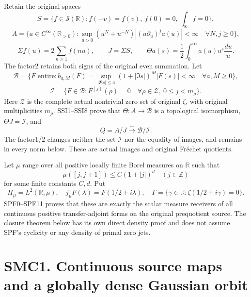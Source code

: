 Retain the original spaces \[
S=\{f\in\mathcal S(\mathbb R):f(-v)=f(v),\ f(0)=0,\ \int_{\mathbb R}f=0\},
\] \[
A=\{a\in C^\infty(\mathbb R_{>0}):
\sup_{u>0}(u^N+u^{-N})|(u\partial_u)^ja(u)|<\infty\quad\forall N,j\ge0\},
\] \[
\Sigma f(u)=2\sum_{n\ge1}f(nu),\qquad J=\Sigma S,\qquad
\Theta a(s)=\frac12\int_0^\infty a(u)u^s\frac{du}{u}.
\tag{SMC0.1}
\] The factor2 retains both signs of the original even summation. Let \[
\mathcal B=\{F\text{ entire}:b_{a,M}(F)=
\sup_{|\Re s|\le a}(1+|\Im s|)^M|F(s)|<\infty\quad\forall a,M\ge0\},
\] \[
\mathcal I=\{F\in\mathcal B:F^{(j)}(\rho)=0\quad
\forall\rho\in\mathscr Z,\ 0\le j<m_\rho\}.
\tag{SMC0.2}
\] Here \(\mathscr Z\) is the complete actual nontrivial zero set of
original \(\zeta\), with original multiplicities \(m_\rho\). SSI1--SSI8
prove that \(\Theta:A\to\mathcal B\) is a topological isomorphism,
\(\Theta J=\mathcal I\), and \[
Q=A/J\xrightarrow{\sim}\mathcal B/\mathcal I.
\tag{SMC0.3}
\] The factor1/2 changes neither the set \(\mathcal I\) nor the equality
of images, and remains in every norm below. These are actual images and
original Fréchet quotients.

Let \(\mu\) range over all positive locally finite Borel measures on
\(\mathbb R\) such that \[
\mu([j,j+1])\le C(1+|j|)^d\quad(j\in\mathbb Z)
\tag{SMC0.4}
\] for some finite constants \(C,d\). Put \[
H_\mu=L^2(\mathbb R,\mu),\quad
j_\mu F(\lambda)=F(1/2+i\lambda),\quad
\Gamma=\{\gamma\in\mathbb R:\zeta(1/2+i\gamma)=0\}.
\tag{SMC0.5}
\] SPF0--SPF11 proves that these are exactly the scalar measure
receivers of all continuous positive transfer-adjoint forms on the
original prequotient source. The closure theorem below has its own
direct density proof and does not assume SPF's cyclicity or any density
of primal zero jets.

\section{SMC1. Continuous source maps and a globally dense Gaussian
orbit}\label{smc1.-continuous-source-maps-and-a-globally-dense-gaussian-orbit}

